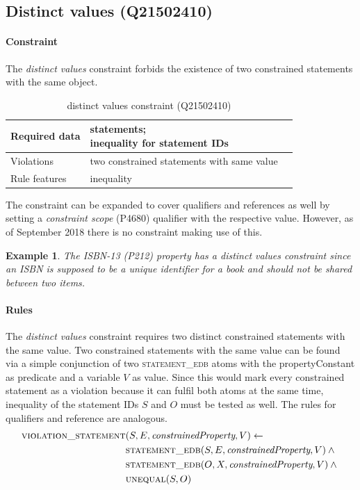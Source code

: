 \documentclass[hyperref,bachelorofscience,fleqn]{cgvpub}
\newtheorem{example}{Example}
\begin{document}
\subsection{Distinct values (Q21502410)}\label{subsec_distinct_values}
\paragraph{Constraint}
The \emph{distinct values} constraint forbids the existence of two constrained statements with the same object.
\begin{table}[H]
\caption{distinct values constraint (Q21502410)}
\begin{tabularx}{\textwidth}{ ll X}
\hline
Required data & \makecell{statements; \\
inequality for statement IDs} \\
\hline
Violations & two constrained statements with same value \\
\hline
Rule features & inequality \\
\hline
\end{tabularx}
\end{table}
The constraint can be expanded to cover qualifiers and references as well by setting a \emph{constraint scope} (P4680) qualifier with the respective value. However, as of September 2018 there is no constraint making use of this.

\begin{example}
The \emph{ISBN-13} (P212) property has a \emph{distinct values} constraint since an ISBN is supposed to be a unique identifier for a book and should not be shared between two items.
\end{example}

\paragraph{Rules}
The \emph{distinct values} constraint requires two distinct constrained statements with the same value. 
Two constrained statements with the same value can be found via a simple conjunction of two \textsc{statement\_edb} atoms with the propertyConstant as predicate and a variable \(V\) as value. Since this would mark every constrained statement as a violation because it can fulfil both atoms at the same time, inequality of the statement IDs \(S\) and \(O\) must be tested as well. The rules for qualifiers and reference are analogous.
\begin{align}
\begin{split}
\textsc{violation\_statement}&(S, E, \emph{constrainedProperty}, V) \leftarrow \\
&\textsc{statement\_edb}(S, E, \emph{constrainedProperty}, V) \wedge{} \\
&\textsc{statement\_edb}(O, X, \emph{constrainedProperty}, V) \wedge{} \\
&\textsc{unequal}(S, O)
\end{split}
\end{align}
\end{document}
